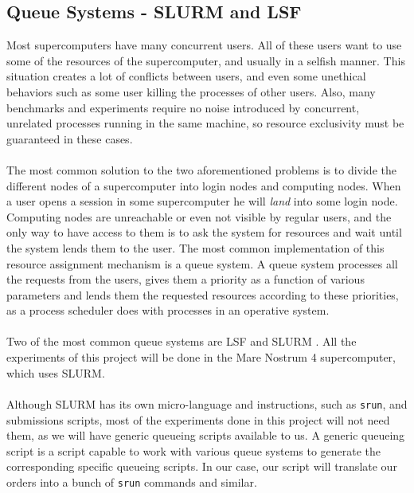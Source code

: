 \subsection{Queue Systems - SLURM and LSF}
\label{subsec:hpc_queues}
Most supercomputers have many concurrent users. All of these users want to use some of the resources of the supercomputer, and usually in a selfish manner. This situation creates a lot of conflicts between users, and even some unethical behaviors such as some user killing the processes of other users. Also, many benchmarks and experiments require no noise introduced by concurrent, unrelated processes running in the same machine, so resource exclusivity must be guaranteed in these cases.\\
\\
The most common solution to the two aforementioned problems is to divide the different nodes of a supercomputer into login nodes and computing nodes. When a user opens a session in some supercomputer he will \textit{land} into some login node. Computing nodes are unreachable or even not visible by regular users, and the only way to have access to them is to ask the system for resources and wait until the system lends them to the user. The most common implementation of this resource assignment mechanism is a queue system. A queue system processes all the requests from the users, gives them a priority as a function of various parameters and lends them the requested resources according to these priorities, as a process scheduler does with processes in an operative system.\\
\\
Two of the most common queue systems are LSF \cite{zhou1992lsf} and SLURM \cite{yoo2003slurm}. All the experiments of this project will be done in the Mare Nostrum 4 supercomputer, which uses SLURM.\\
\\
Although SLURM has its own micro-language and instructions, such as \verb|srun|, and submissions scripts, most of the experiments done in this project will not need them, as we will have generic queueing scripts available to us. A generic queueing script is a script capable to work with various queue systems to generate the corresponding specific queueing scripts. In our case, our script will translate our orders into a bunch of \verb|srun| commands and similar.\\
